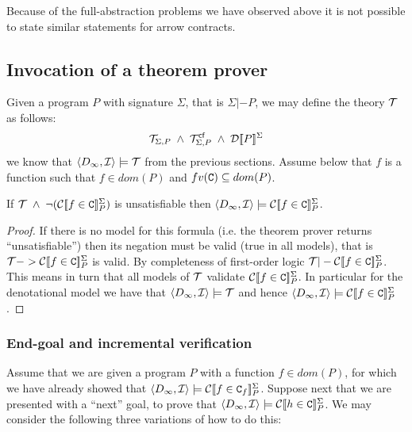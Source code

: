 \documentclass[preprint,nocopyrightspace,draft]{sigplanconf}
\begin{document}
Because of the full-abstraction problems we have observed above it 
is not possible to state similar statements for arrow contracts. 


\subsection{Invocation of a theorem prover}\label{sect:infocation}

Given a program $P$ with signature $\Sigma$, that is $\Sigma |- P$, we may define the theory
${\cal T}$ as follows:
     \[ \Th{\Sigma}{P}\;\land\;\Th{\Sigma}{P}^{\lcfZ}\;\land\;\dtrans{\Sigma}{P} \]
we know that $\langle D_\infty,{\cal I}\rangle \models {\cal T}$ from the previous sections. 
Assume below that $f$ is a function such that $f \in dom(P)$ and $fv(\Ct) \subseteq dom(P)$.

\begin{theorem}[Soundness]\label{thm:prover-soundess}
If ${\cal T}\;\land\;\neg(\ctrans{\Sigma}{P}{f \in \Ct})$ is 
unsatisfiable then $\langle D_\infty,{\cal I}\rangle \models \ctrans{\Sigma}{P}{f \in \Ct}$.
\end{theorem}
\begin{proof}
If there is no model for this formula (i.e. the theorem prover returns ``unsatisfiable'') then
its negation must be valid (true in all models), that 
is ${\cal T} -> \ctrans{\Sigma}{P}{f \in \Ct}$ is valid. By completeness
of first-order logic ${\cal T} |- \ctrans{\Sigma}{P}{f \in \Ct}$. This means in 
turn that all models of ${\cal T}$ validate $\ctrans{\Sigma}{P}{f \in \Ct}$. In particular 
for the denotational model we have that $\langle D_\infty,{\cal I}\rangle \models {\cal T}$ 
and hence $\langle D_\infty,{\cal I}\rangle \models \ctrans{\Sigma}{P}{f \in \Ct}$.
\end{proof}

\subsubsection{End-goal and incremental verification}\label{sect:incremental}

Assume that we are given a program $P$ with a function $f \in dom(P)$, for which we have 
already showed that $\langle D_\infty,{\cal I}\rangle \models \ctrans{\Sigma}{P}{f \in \Ct_f}$. 
Suppose next that we are presented with a ``next'' goal, to prove that 
$\langle D_\infty,{\cal I}\rangle \models \ctrans{\Sigma}{P}{h \in \Ct}$. 
We may consider the following three variations of how to do this:
\end{document}
